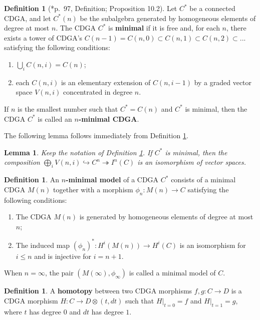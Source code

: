 \documentclass[11pt]{amsart}
\newtheorem{lemma}[theorem]{Lemma}
\theoremstyle{definition}
\newtheorem{definition}[theorem]{Definition}
\numberwithin{equation}{section}
\numberwithin{equation}{section}
\begin{document}
\begin{definition}[\cite{MGriffiths-Morgan-rational-homotopy}*{p.~97, Definition; Proposition 10.2}]\label{Def: minimal CDGA}
Let $C^*$ be a connected CDGA, and let $C^*(n)$ be the subalgebra generated by homogeneous elements of degree at most $n$. The CDGA $C^*$ is \textbf{minimal} if it is free and, for each $n$, there exists a tower of CDGA's $C(n-1)=C(n,0)\subset C(n,1)\subset C(n,2)\subset ...$ satisfying the following conditions: 
\begin{enumerate}[leftmargin=0.27in]
    \item $\bigcup_{i}C(n,i)=C(n)$;
    \item each $C(n,i)$ is an elementary extension of $C(n,i-1)$ by a graded vector space $V(n,i)$ concentrated in degree $n$.
\end{enumerate}
If $n$ is the smallest number such that $C^*=C(n)$ and $C^*$ is minimal, then the CDGA $C^*$ is called an \textbf{$n$-minimal CDGA}. 
\end{definition}

The following lemma follows immediately from Definition \ref{Def: minimal CDGA}.

\begin{lemma}
Keep the notation of Definition \ref{Def: minimal CDGA}. If $C^*$ is minimal, then the composition $\bigoplus_i V(n,i)\hookrightarrow C^n\twoheadrightarrow I^n(C)$ is an isomorphism of vector spaces.
\end{lemma}

\begin{definition}\label{Def: n-minmal model}
An \textbf{$n$-minimal model} of a CDGA $C^*$ consists of a minimal CDGA $M(n)$ together with a morphism $\phi_n:M(n)\rightarrow C$ satisfying the following conditions:
\begin{enumerate}[leftmargin=0.25in]
    \item The CDGA $M(n)$ is generated by homogeneous elements of degree at most $n$;
    \item The induced map $(\phi_n)^*:H^i(M(n))\rightarrow H^i(C)$ is an isomorphism for $i\leq n$ and is injective for $i=n+1$.
\end{enumerate}
When $n=\infty$, the pair $(M(\infty),\phi_{\infty})$ is called a minimal model of $C$.
\end{definition}

\begin{definition}
A \textbf{homotopy} between two CDGA morphisms $f,g:C\rightarrow D$ is a CDGA morphism $H:C\rightarrow D\otimes (t,dt)$ such that $H\vert_{t=0}=f$ and $H\vert_{t=1}=g$, where $t$ has degree $0$ and $dt$ has degree $1$.
\end{definition}
\end{document}
